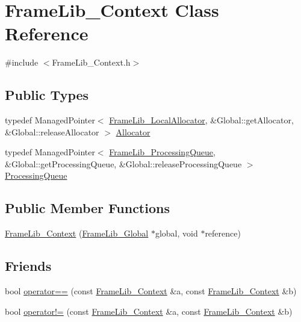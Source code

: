 \hypertarget{class_frame_lib___context}{}\section{Frame\+Lib\+\_\+\+Context Class Reference}
\label{class_frame_lib___context}


{\ttfamily \#include $<$Frame\+Lib\+\_\+\+Context.\+h$>$}

\subsection*{Public Types}
\begin{DoxyCompactItemize}
\item 
typedef Managed\+Pointer$<$ \hyperlink{class_frame_lib___local_allocator}{Frame\+Lib\+\_\+\+Local\+Allocator}, \&Global\+::get\+Allocator, \&Global\+::release\+Allocator $>$ \hyperlink{class_frame_lib___context_a4cfa321c8f6048211d031f05156b5b19}{Allocator}
\item 
typedef Managed\+Pointer$<$ \hyperlink{class_frame_lib___processing_queue}{Frame\+Lib\+\_\+\+Processing\+Queue}, \&Global\+::get\+Processing\+Queue, \&Global\+::release\+Processing\+Queue $>$ \hyperlink{class_frame_lib___context_af25ffc646e2a2062cd126357acd714df}{Processing\+Queue}
\end{DoxyCompactItemize}
\subsection*{Public Member Functions}
\begin{DoxyCompactItemize}
\item 
\hyperlink{class_frame_lib___context_a2cfe1912e3e9d835de291277c8979ed8}{Frame\+Lib\+\_\+\+Context} (\hyperlink{class_frame_lib___global}{Frame\+Lib\+\_\+\+Global} $\ast$global, void $\ast$reference)
\end{DoxyCompactItemize}
\subsection*{Friends}
\begin{DoxyCompactItemize}
\item 
bool \hyperlink{class_frame_lib___context_ab0382454ba28ee3ff302be24ffc861c0}{operator==} (const \hyperlink{class_frame_lib___context}{Frame\+Lib\+\_\+\+Context} \&a, const \hyperlink{class_frame_lib___context}{Frame\+Lib\+\_\+\+Context} \&b)
\item 
bool \hyperlink{class_frame_lib___context_a7aed82ce3d334858032a3c45e3c70169}{operator!=} (const \hyperlink{class_frame_lib___context}{Frame\+Lib\+\_\+\+Context} \&a, const \hyperlink{class_frame_lib___context}{Frame\+Lib\+\_\+\+Context} \&b)
\end{DoxyCompactItemize}


